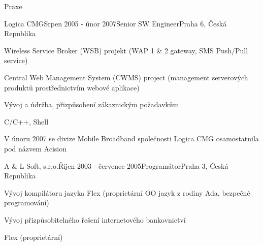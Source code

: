 \documentclass{resume} %
\begin{document}
\begin{rSection}{Praxe}

\begin{rSubsection}{Logica CMG}{Srpen 2005 - \'{u}nor 2007}{Senior SW Engineer}{Praha 6, \v{C}esk\'{a} Republika}
\item Wireless Service Broker (WSB) projekt (WAP 1 \& 2 gateway, SMS Push/Pull service)
\item Central Web Management System (CWMS) project (management serverov\'{y}ch produkt\r{u} prost\v{r}ednictv\'{i}m webov\'{e} aplikace)
\item V\'{y}voj a \'{u}dr\v{z}ba, p\v{r}izp\r{u}soben\'{i} z\'{a}kaznick\'{y}m po\v{z}adavk\r{u}m
\item C/C++, Shell
\item V \'{u}noru 2007 se divize Mobile Broadband spole\v{c}nosti Logica CMG osamostatnila pod n\'{a}zvem Acision
\end{rSubsection}


\begin{rSubsection}{A \& L Soft, s.r.o.}{\v{R}\'{i}jen 2003 - \v{c}ervenec 2005}{Program\'{a}tor}{Praha 3, \v{C}esk\'{a} Republika}
\item V\'{y}voj kompil\'{a}toru jazyka Flex (propriet\'{a}rn\'{i} OO jazyk z rodiny Ada, bezpe\v{c}n\'{e} programov\'{a}n\'{i})
\item V\'{y}voj p\v{r}izp\r{u}sobiteln\'{e}ho \v{r}e\v{s}en\'{i} internetov\'{e}ho bankovnictv\'{i}
\item Flex (propriet\'{a}rn\'{i})
\end{rSubsection}

\end{rSection}

\end{document}
